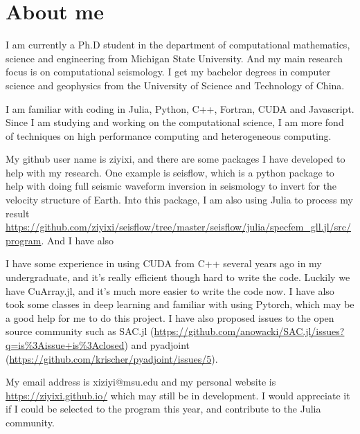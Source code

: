 \documentclass[12pt]{extarticle}
\begin{document}
\section{About me}
I am currently a Ph.D student in the department of computational mathematics, science and engineering from Michigan State University. And my main 
research focus is on computational seismology. I get my bachelor degrees in computer science and geophysics from the University of Science and Technology of
China.

I am familiar with coding in Julia, Python, C++, Fortran, CUDA and Javascript. Since I am studying and working on the computational science, 
I am more fond of techniques on high performance computing and heterogeneous computing.

My github user name is ziyixi, and there are some packages I have developed to help with my research. One example is seisflow, which is a python package 
to help with doing full seismic waveform inversion in seismology to invert for the velocity structure of Earth. Into this package, I am also using
Julia to process my result \url{https://github.com/ziyixi/seisflow/tree/master/seisflow/julia/specfem_gll.jl/src/program}. And I have also 

I have some experience in using CUDA from C++ several years ago in my undergraduate, and it's really efficient though hard to write the code. Luckily we have 
CuArray.jl, and it's much more easier to write the code now. I have also took some classes in deep learning and familiar with using Pytorch, which may 
be a good help for me to do this project. I have also proposed issues to the open source community such as SAC.jl (\url{https://github.com/anowacki/SAC.jl/issues?q=is%3Aissue+is%3Aclosed})
and pyadjoint (\url{https://github.com/krischer/pyadjoint/issues/5}). 

My email address is xiziyi@msu.edu and my personal website is \url{https://ziyixi.github.io/} which may still be in development. I would appreciate it if I 
could be selected to the program this year, and contribute to the Julia community.
\end{document}
